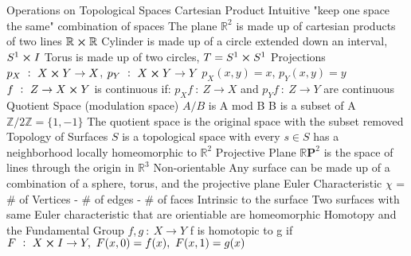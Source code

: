 \documentclass[14pt]{extarticle}
\begin{document}
\begin{outline}
		\1	Operations on Topological Spaces
			\2	Cartesian Product
				\3	Intuitive "keep one space the same" combination of spaces
				\3	The plane $\mathbb{R}^2$ is made up of cartesian products of two lines $\mathbb{R} \cross \mathbb{R}$
				\3	Cylinder is made up of a circle extended down an interval, $S^1 \cross I$
				\3	Torus is made up of two circles, $T = S^1 \cross S^1$
			\2	Projections
				\3	$p_X~:~X \cross Y \rightarrow X$, $p_Y~:~X\cross Y \rightarrow Y$
				\3	$p_X(x,y) = x$, $p_Y(x,y) = y$
				\3	$f~:~Z \rightarrow X \cross Y$ is continuous if:
					\4	$p_Xf~:~Z\rightarrow X$ and $p_Yf~:~Z\rightarrow Y$ are continuous		
			\2	Quotient Space (modulation space)
				\3	$A / B$ is A mod B
				\3	B is a subset of A
				\3	$\mathbb{Z} / 2\mathbb{Z} = \{1,-1\}$ 
				\3	The quotient space is the original space with the subset removed
		\1	Topology of Surfaces
			\2	$S$ is a topological space with every $s \in S$ has a neighborhood locally homeomorphic to $\mathbb{R}^2$
			\2	Projective Plane
				\3	$\mathbb{R}\bm{P}^2$ is the space of lines through the origin in $\mathbb{R}^3$
				\3	Non-orientable
			\2	Any surface can be made up of a combination of a sphere, torus, and the projective plane
			\2	Euler Characteristic $\chi$ = \# of Vertices - \# of edges - \# of faces
				\3	Intrinsic to the surface
				\3	Two surfaces with same Euler characteristic that are orientiable are homeomorphic
		\1	Homotopy and the Fundamental Group
			\2	$f,g~:~X\rightarrow Y$
			\2	f is homotopic to g if $F~:~X\cross I \rightarrow Y,~F(x,0) = f(x),~F(x,1) = g(x)$
	\end{outline}
\end{document}
